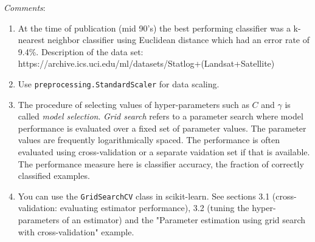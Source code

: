 \documentclass[11pt]{article}
\begin{document}
\emph{Comments}:

\begin{enumerate}
\def\labelenumi{\arabic{enumi})}
\item
  At the time of publication (mid 90's) the best performing classifier
  was a k-nearest neighbor classifier using Euclidean distance which had
  an error rate of 9.4\%. Description of the data set:
  https://archive.ics.uci.edu/ml/datasets/Statlog+(Landsat+Satellite)
\item
  Use \texttt{preprocessing.StandardScaler} for data scaling.
\item
  The procedure of selecting values of hyper-parameters such as \(C\)
  and \(\gamma\) is called \emph{model selection}. \emph{Grid search}
  refers to a parameter search where model performance is evaluated over
  a fixed set of parameter values. The parameter values are frequently
  logarithmically spaced. The performance is often evaluated using
  cross-validation or a separate vaidation set if that is available. The
  performance measure here is classifier accuracy, the fraction of
  correctly classified examples.
\item
  You can use the \texttt{GridSearchCV} class in scikit-learn. See
  sections 3.1 (cross-validation: evaluating estimator performance), 3.2
  (tuning the hyper-parameters of an estimator) and the "Parameter
  estimation using grid search with cross-validation" example.
\end{enumerate}
\end{document}
